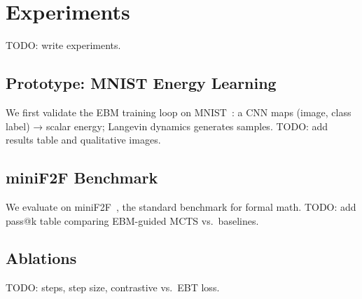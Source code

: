 
\section{Experiments}
\label{sec:experiments}

TODO: write experiments.

\subsection{Prototype: MNIST Energy Learning}

We first validate the EBM training loop on MNIST~\cite{lecun1998mnist}:
a CNN maps (image, class label) → scalar energy; Langevin dynamics generates samples.
TODO: add results table and qualitative images.

\subsection{miniF2F Benchmark}

We evaluate on miniF2F~\cite{TODO}, the standard benchmark for formal math.
TODO: add pass@k table comparing EBM-guided MCTS vs.\ baselines.

\subsection{Ablations}

TODO: steps, step size, contrastive vs.\ EBT loss.
